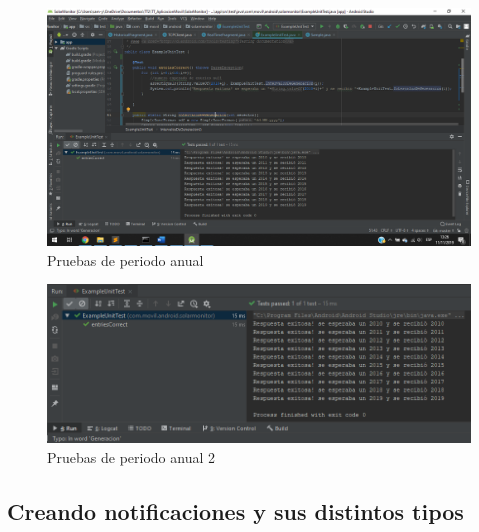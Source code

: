 \begin{figure}[H]
	\centering
	\includegraphics[scale=.4]{Capitulo5/images/PruebasAnualPeriodo.png}
	\caption{Pruebas de periodo anual}
	\label{fig:Pruebas_de_periodo_anual}
\end{figure}

\begin{figure}[H]
	\centering
	\includegraphics[scale=.4]{Capitulo5/images/PruebasAnualPeriodo2.png}
	\caption{Pruebas de periodo anual 2}
	\label{fig:Pruebas_de_periodo_anual2}
\end{figure}

\subsection{Creando notificaciones y sus distintos tipos}

